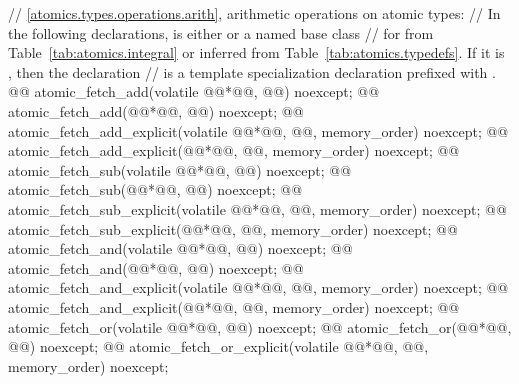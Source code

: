 \begin{codeblock}
{  // \ref{atomics.types.operations.arith}, arithmetic operations on atomic types:
  // In the following declarations,  is either  or a named base class
  // for  from Table~\ref{tab:atomics.integral} or inferred from Table~\ref{tab:atomics.typedefs}. If it is , then the declaration
  // is a template specialization declaration prefixed with .
  @@ atomic_fetch_add(volatile @@*@\itcorr[-1]@, @@) noexcept;
  @@ atomic_fetch_add(@@*@\itcorr[-1]@, @@) noexcept;
  @@ atomic_fetch_add_explicit(volatile @@*@\itcorr[-1]@, @@, memory_order) noexcept;
  @@ atomic_fetch_add_explicit(@@*@\itcorr[-1]@, @@, memory_order) noexcept;
  @@ atomic_fetch_sub(volatile @@*@\itcorr[-1]@, @@) noexcept;
  @@ atomic_fetch_sub(@@*@\itcorr[-1]@, @@) noexcept;
  @@ atomic_fetch_sub_explicit(volatile @@*@\itcorr[-1]@, @@, memory_order) noexcept;
  @@ atomic_fetch_sub_explicit(@@*@\itcorr[-1]@, @@, memory_order) noexcept;
  @@ atomic_fetch_and(volatile @@*@\itcorr[-1]@, @@) noexcept;
  @@ atomic_fetch_and(@@*@\itcorr[-1]@, @@) noexcept;
  @@ atomic_fetch_and_explicit(volatile @@*@\itcorr[-1]@, @@, memory_order) noexcept;
  @@ atomic_fetch_and_explicit(@@*@\itcorr[-1]@, @@, memory_order) noexcept;
  @@ atomic_fetch_or(volatile @@*@\itcorr[-1]@, @@) noexcept;
  @@ atomic_fetch_or(@@*@\itcorr[-1]@, @@) noexcept;
  @@ atomic_fetch_or_explicit(volatile @@*@\itcorr[-1]@, @@, memory_order) noexcept;
}
\end{codeblock}
